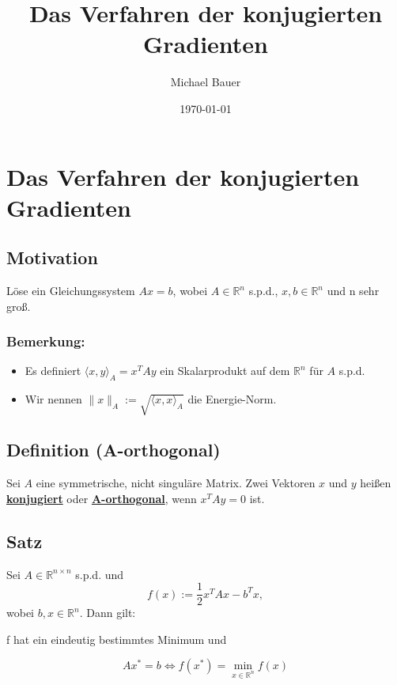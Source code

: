 \documentclass{article}
\title{Das Verfahren der konjugierten Gradienten}
\author{Michael Bauer}
\date{\today{}}
\begin{document}
\maketitle
\tableofcontents
\newpage
\large


\section*{Das Verfahren der konjugierten Gradienten}

\subsection{Motivation}
\label{sec:motivation}
Löse ein Gleichungssystem $Ax = b$, wobei $A\in\mathbb{R}^{n}$ s.p.d., $x, b\in\mathbb{R}^{n}$ und n sehr groß.

\subsubsection{Bemerkung:}
\begin{itemize}
\item Es definiert $\langle x,y \rangle _{A} = x^{T}Ay$ ein Skalarprodukt auf dem $\mathbb{R}^{n}$ für $A$ s.p.d.
\item Wir nennen $\|x\|_{A} := \sqrt{\langle x, x \rangle _{A}}$ die Energie-Norm.
\end{itemize}

\subsection{Definition (A-orthogonal)}
Sei $A$ eine symmetrische, nicht singuläre Matrix. Zwei Vektoren $x$ und $y$ heißen \underline{\textbf{konjugiert}} oder \underline{\textbf{A-orthogonal}}, wenn $x^{T}Ay = 0$ ist.

\subsection{Satz}
Sei $A\in\mathbb{R}^{n \times n}$ s.p.d. und
\begin{equation}
f(x) := \frac 1 2 x^{T}Ax - b^{T}x,
\end{equation}
wobei $b,x \in \mathbb{R}^{n}$. Dann gilt:
\begin{center}
f hat ein eindeutig bestimmtes Minimum und
\end{center}
\begin{equation}
Ax^{*} = b \Longleftrightarrow f(x^{*}) = \underset{x\in\mathbb{R}^{n}}{\min} f(x)
\end{equation}
\end{document}
